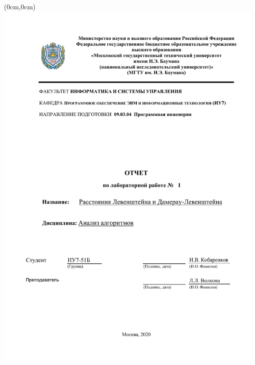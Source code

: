 \documentclass[12pt,a4paper]{article}
\begin{document}
	\begin{titlepage}
		\begin{textblock*}{13cm}(0cm,0cm)
			\includegraphics{title_01}
		\end{textblock*}
	\end{titlepage}
\hspace{0pt}
\clearpage

\tableofcontents
\clearpage

\end{document}
